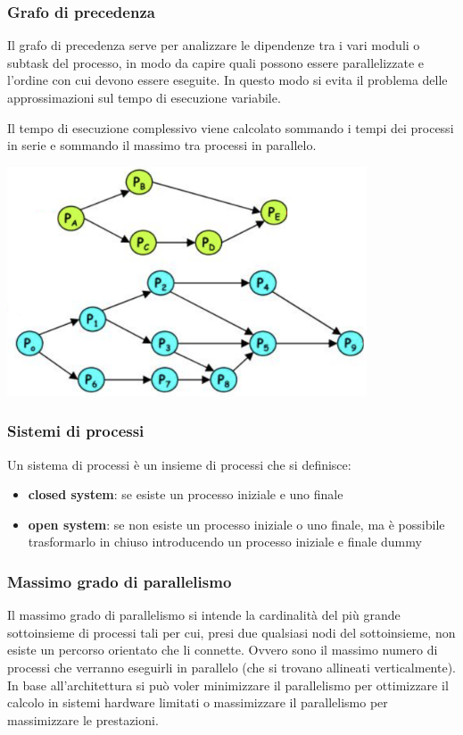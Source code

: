 \documentclass[a4paper]{article}
\begin{document}
\subsubsection*{Grafo di precedenza}
\begin{center}
	\begin{minipage}{0.59\textwidth}
		Il grafo di precedenza serve per analizzare le dipendenze tra i vari moduli o subtask del processo, in modo da capire quali
		possono essere parallelizzate e l'ordine con cui devono essere eseguite. In questo modo si evita il problema delle
		approssimazioni sul tempo di esecuzione variabile.
		
		Il tempo di esecuzione complessivo viene calcolato sommando i tempi dei processi in serie e sommando il massimo tra
		processi in parallelo.
	\end{minipage}
	\begin{minipage}{0.4\textwidth}
		\centering
		\includegraphics[width=0.8\textwidth]{diagramma precedenze.png}
	\end{minipage}
\end{center}

\subsubsection*{Sistemi di processi}
Un sistema di processi è un insieme di processi che si definisce:
\begin{itemize}
	\item \textbf{closed system}: se esiste un processo iniziale e uno finale
	\item \textbf{open system}: se non esiste un processo iniziale o uno finale, ma è possibile trasformarlo in chiuso
	introducendo  un processo iniziale e finale dummy
\end{itemize}

\subsubsection*{Massimo grado di parallelismo}
Il massimo grado di parallelismo si intende la cardinalità del più grande sottoinsieme di processi tali per cui, presi due
qualsiasi nodi del sottoinsieme, non esiste un percorso orientato che li connette. Ovvero sono il massimo numero di processi
che verranno eseguirli in parallelo (che si trovano allineati verticalmente). In base all'architettura si può voler  minimizzare
il parallelismo per ottimizzare il calcolo in sistemi hardware limitati o massimizzare il parallelismo per massimizzare le
prestazioni.
\end{document}
